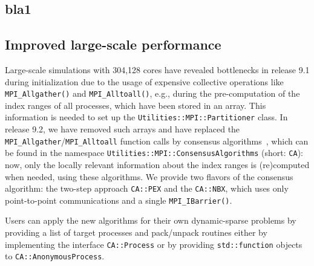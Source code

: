 \documentclass{ansarticle-preprint}
\begin{document}
\subsection{bla1}
\label{subsec:bla1}


\subsection{Improved large-scale performance}
\label{subsec:performance}

Large-scale simulations with 304,128 cores have revealed bottlenecks in release 
9.1 during initialization due to the usage of expensive collective operations 
like \texttt{MPI\_Allgather()} and \texttt{MPI\_\allowbreak Alltoall()}, e.g., during the 
pre-computation of the index ranges of all processes, which have been stored in  an array. 
This information is needed to set up 
the  \texttt{Utilities::MPI::Par\-ti\-ti\-oner} class. 
In release 9.2, we have removed such arrays and have replaced 
the \texttt{MPI\_Allgather}/\allowbreak\texttt{MPI\_\allowbreak Alltoall} 
function calls by consensus algorithms~\cite{hoefler2010scalable}, which can be 
found in the namespace \texttt{Utilities::\allowbreak MPI::\allowbreak ConsensusAlgorithms} (short: \texttt{CA}): now, only the locally relevant information about the index ranges is (re)computed when needed, using these algorithms. 
We provide two flavors of the consensus algorithm: the two-step 
approach \texttt{CA::PEX} and the \texttt{CA::NBX}, 
which uses only point-to-point communications and a single \texttt{MPI\_IBarrier()}.


Users can apply the new algorithms for their own dynamic-sparse problems by 
providing a list of target 
processes and pack/unpack routines either by implementing the interface 
\texttt{CA::\allowbreak Process} or by providing \texttt{std::function} 
objects to \texttt{CA::AnonymousProcess}.
\end{document}
